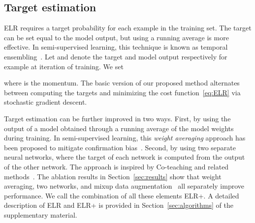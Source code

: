 \documentclass{article}
\newcommand{\1}{\mathds{1}}
\begin{document}
\subsection{Target estimation}
\label{sec:targets}
ELR requires a target probability for each example in the training set. The target can be set equal to the model output, but using a running average is more effective. In semi-supervised learning, this technique is known as temporal ensembling~\citep{laine2016temporal}. Let  and  denote the target and model output respectively for example  at iteration  of training. We set

where  is the momentum. The basic version of our proposed method alternates between computing the targets and minimizing the cost function~\eqref{eq:ELR} via stochastic gradient descent.


Target estimation can be further improved in two ways. First, by using the output of a model obtained through a running average of the model weights during training. In semi-supervised learning, this \emph{weight averaging} approach has been proposed to mitigate confirmation bias~\citep{tarvainen2017mean}. Second, by using two separate neural networks, where the target of each network is computed from the output of the other network. The approach is inspired by Co-teaching and related methods~\citep{Han2018CoteachingRT,Yu2019HowDD,li2020dividemix}. The ablation results in Section~\ref{sec:results} show that weight averaging, two networks, and mixup data augmentation~\citep{zhang2017mixup} all separately improve performance. We call the combination of all these elements ELR+. A detailed description of ELR and ELR+ is provided in Section~\ref{sec:algorithms} of the supplementary material. 
\end{document}
